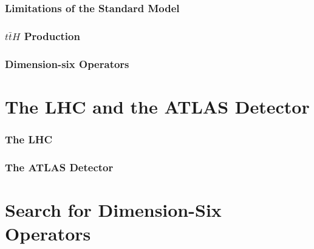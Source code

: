\documentclass[NOTE, atlasdraft=true, texlive=2016, UKenglish]{\ATLASLATEXPATH atlasdoc}
\begin{document}
\section{Limitations of the Standard Model}
\label{sec:smProblems}

\section{$t\bar{t}H$ Production}
\label{sec:tth_theory}

\section{Dimension-six Operators}
\label{sec:smProblems}

\part{The LHC and the ATLAS Detector}
\label{part:lhcAtlas}

\section{The LHC}
\label{sec:lhc}

\section{The ATLAS Detector}
\label{sec:atlas}

\part{Search for Dimension-Six Operators}
\label{sec:evt_selection}
\end{document}
